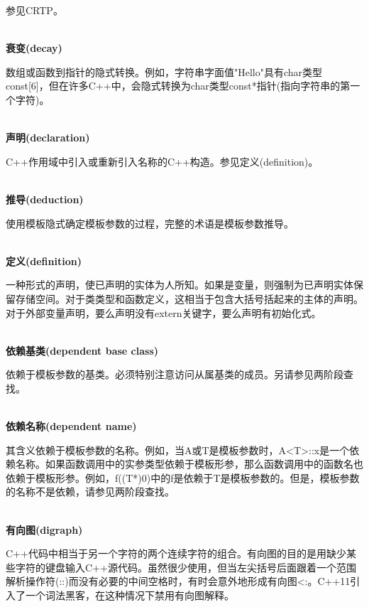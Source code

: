 参见CRTP。

\hspace*{\fill} \\ %
\noindent
\textbf{衰变(decay)}

数组或函数到指针的隐式转换。例如，字符串字面值"Hello"具有char类型const[6]，但在许多C++中，会隐式转换为char类型const*指针(指向字符串的第一个字符)。

\hspace*{\fill} \\ %
\noindent
\textbf{声明(declaration)}

C++作用域中引入或重新引入名称的C++构造。参见定义(definition)。

\hspace*{\fill} \\ %
\noindent
\textbf{推导(deduction)}

使用模板隐式确定模板参数的过程，完整的术语是模板参数推导。

\hspace*{\fill} \\ %
\noindent
\textbf{定义(definition)}

一种形式的声明，使已声明的实体为人所知。如果是变量，则强制为已声明实体保留存储空间。对于类类型和函数定义，这相当于包含大括号括起来的主体的声明。对于外部变量声明，要么声明没有extern关键字，要么声明有初始化式。

\hspace*{\fill} \\ %
\noindent
\textbf{依赖基类(dependent base class)}

依赖于模板参数的基类。必须特别注意访问从属基类的成员。另请参见两阶段查找。

\hspace*{\fill} \\ %
\noindent
\textbf{依赖名称(dependent name)}

其含义依赖于模板参数的名称。例如，当A或T是模板参数时，A<T>::x是一个依赖名称。如果函数调用中的实参类型依赖于模板形参，那么函数调用中的函数名也依赖于模板形参。例如，f((T*)0)中的f是依赖于T是模板参数的。但是，模板参数的名称不是依赖，请参见两阶段查找。

\hspace*{\fill} \\ %
\noindent
\textbf{有向图(digraph)}

C++代码中相当于另一个字符的两个连续字符的组合。有向图的目的是用缺少某些字符的键盘输入C++源代码。虽然很少使用，但当左尖括号后面跟着一个范围解析操作符(::)而没有必要的中间空格时，有时会意外地形成有向图<:。C++11引入了一个词法黑客，在这种情况下禁用有向图解释。

